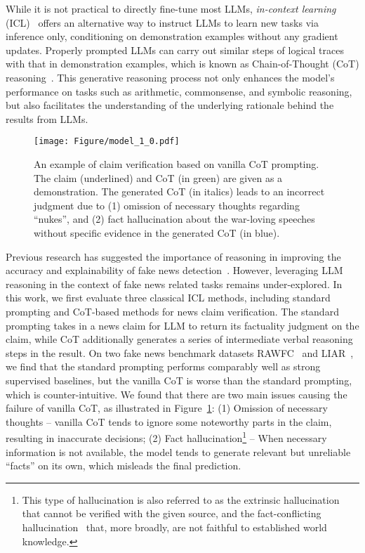 \documentclass[11pt]{article}
\begin{document}
While it is not practical to directly fine-tune most LLMs, \textit{in-context learning} (ICL)~\cite{brown2020language} offers an alternative way to instruct LLMs to learn new tasks via inference only, conditioning on demonstration examples without any gradient updates. 
Properly prompted LLMs can carry out similar steps of logical traces with that in demonstration examples, which is known as Chain-of-Thought (CoT) reasoning~\cite{wei2022chain}. 
This generative reasoning process not only enhances the model's performance on tasks such as arithmetic, commonsense, and symbolic reasoning, but also facilitates the understanding of the underlying rationale behind the results from LLMs.

\begin{figure}[t!]
\centering
\texttt{[image: Figure/model\_1\_0.pdf]} 
\caption{An example of claim verification based on vanilla CoT prompting. The claim (underlined) and CoT (in green) are given as a demonstration. The generated CoT (in italics) leads to an incorrect judgment due to (1) omission of necessary thoughts regarding ``nukes'', and (2) fact hallucination about the war-loving speeches without specific evidence in the generated CoT (in blue).}
\label{demons}
\end{figure}

Previous research has suggested the importance of reasoning in improving the accuracy and explainability of fake news detection~\cite{jin2022towards}. However, leveraging LLM reasoning in the context of fake news related tasks remains under-explored.
In this work, we first evaluate three classical ICL methods, including standard prompting and CoT-based methods for news claim verification. The standard prompting takes in a news claim for LLM to return its factuality judgment on the claim, while CoT additionally generates a series of intermediate verbal reasoning steps in the result. On two fake news benchmark datasets RAWFC~\cite{yang2022coarse} and LIAR~\cite{wang2017liar}, we find that the standard prompting performs comparably well as strong supervised baselines, but the vanilla CoT is worse than the standard prompting, which is counter-intuitive. We found that there are two main issues causing the failure of vanilla CoT, as illustrated in Figure~\ref{demons}: (1) Omission of necessary thoughts -- vanilla CoT tends to ignore some noteworthy parts in the claim, resulting in inaccurate decisions; (2) Fact hallucination\footnote{This type of hallucination is also referred to as the extrinsic hallucination~\cite{bang2023multitask} that cannot be verified with the given source, and the fact-conflicting hallucination~\cite{zhang2023siren} that, more broadly, are not faithful to established world knowledge.} -- When necessary information is not available, the model tends to generate relevant but unreliable ``facts'' on its own, which misleads the final prediction. 
 
\end{document}
